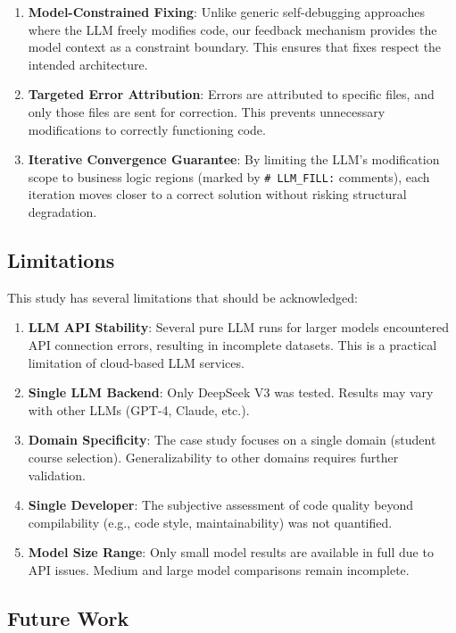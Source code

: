 \documentclass[11pt,a4paper]{article}
\begin{document}
\begin{enumerate}[leftmargin=*]
    \item \textbf{Model-Constrained Fixing}: Unlike generic self-debugging approaches where the LLM freely modifies code, our feedback mechanism provides the model context as a constraint boundary. This ensures that fixes respect the intended architecture.
    \item \textbf{Targeted Error Attribution}: Errors are attributed to specific files, and only those files are sent for correction. This prevents unnecessary modifications to correctly functioning code.
    \item \textbf{Iterative Convergence Guarantee}: By limiting the LLM's modification scope to business logic regions (marked by {\lstinline|# LLM_FILL:|} comments), each iteration moves closer to a correct solution without risking structural degradation.
\end{enumerate}

\subsection{Limitations}

This study has several limitations that should be acknowledged:

\begin{enumerate}[leftmargin=*]
    \item \textbf{LLM API Stability}: Several pure LLM runs for larger models encountered API connection errors, resulting in incomplete datasets. This is a practical limitation of cloud-based LLM services.
    \item \textbf{Single LLM Backend}: Only DeepSeek V3 was tested. Results may vary with other LLMs (GPT-4, Claude, etc.).
    \item \textbf{Domain Specificity}: The case study focuses on a single domain (student course selection). Generalizability to other domains requires further validation.
    \item \textbf{Single Developer}: The subjective assessment of code quality beyond compilability (e.g., code style, maintainability) was not quantified.
    \item \textbf{Model Size Range}: Only small model results are available in full due to API issues. Medium and large model comparisons remain incomplete.
\end{enumerate}

\subsection{Future Work}
\end{document}
